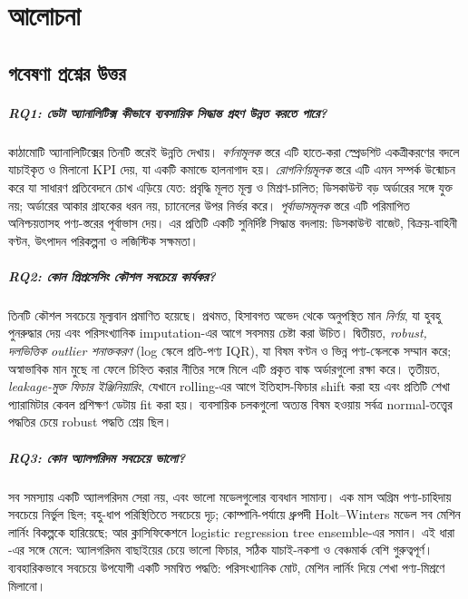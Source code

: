 \chapter{আলোচনা}\label{ch:discussion}

\section{গবেষণা প্রশ্নের উত্তর}

\paragraph{RQ1: ডেটা অ্যানালিটিক্স কীভাবে ব্যবসায়িক সিদ্ধান্ত গ্রহণ উন্নত করতে পারে?}
কাঠামোটি অ্যানালিটিক্সের তিনটি স্তরেই উন্নতি দেখায়। \emph{বর্ণনামূলক} স্তরে এটি হাতে-করা স্প্রেডশিট একত্রীকরণের বদলে যাচাইকৃত ও
মিলানো KPI দেয়, যা একটি কমান্ডে হালনাগাদ হয়। \emph{রোগনির্ণয়মূলক} স্তরে এটি এমন সম্পর্ক উন্মোচন করে যা সাধারণ প্রতিবেদনে চোখ
এড়িয়ে যেত: প্রবৃদ্ধি মূলত মূল্য ও মিশ্রণ-চালিত; ডিসকাউন্ট বড় অর্ডারের সঙ্গে যুক্ত নয়; অর্ডারের আকার গ্রাহকের ধরন নয়, চ্যানেলের উপর নির্ভর
করে। \emph{পূর্বাভাসমূলক} স্তরে এটি পরিমাপিত অনিশ্চয়তাসহ পণ্য-স্তরের পূর্বাভাস দেয়। এর প্রতিটি একটি সুনির্দিষ্ট সিদ্ধান্ত বদলায়: ডিসকাউন্ট
বাজেট, বিক্রয়-বাহিনী বণ্টন, উৎপাদন পরিকল্পনা ও লজিস্টিক সক্ষমতা।

\paragraph{RQ2: কোন প্রিপ্রসেসিং কৌশল সবচেয়ে কার্যকর?}
তিনটি কৌশল সবচেয়ে মূল্যবান প্রমাণিত হয়েছে। প্রথমত, হিসাবগত অভেদ থেকে অনুপস্থিত মান \emph{নির্ণয়}, যা হুবহু পুনরুদ্ধার দেয় এবং
পরিসংখ্যানিক imputation-এর আগে সবসময় চেষ্টা করা উচিত। দ্বিতীয়ত, \emph{robust, দলভিত্তিক outlier শনাক্তকরণ} (log স্কেলে প্রতি-পণ্য
IQR), যা বিষম বণ্টন ও ভিন্ন পণ্য-স্কেলকে সম্মান করে; অস্বাভাবিক মান মুছে না ফেলে চিহ্নিত করার নীতির সঙ্গে মিলে এটি প্রকৃত বাল্ক অর্ডারগুলো
রক্ষা করে। তৃতীয়ত, \emph{leakage-মুক্ত ফিচার ইঞ্জিনিয়ারিং}, যেখানে rolling-এর আগে ইতিহাস-ফিচার shift করা হয় এবং প্রতিটি শেখা প্যারামিটার
কেবল প্রশিক্ষণ ডেটায় fit করা হয়। ব্যবসায়িক চলকগুলো অত্যন্ত বিষম হওয়ায় সর্বত্র normal-তত্ত্বের পদ্ধতির চেয়ে robust পদ্ধতি শ্রেয় ছিল।

\paragraph{RQ3: কোন অ্যালগরিদম সবচেয়ে ভালো?}
সব সমস্যায় একটি অ্যালগরিদম সেরা নয়, এবং ভালো মডেলগুলোর ব্যবধান সামান্য। এক মাস অগ্রিম পণ্য-চাহিদায় \BestReg সবচেয়ে নির্ভুল ছিল;
বহু-ধাপ পরিস্থিতিতে \BestRec সবচেয়ে দৃঢ়; কোম্পানি-পর্যায়ে ধ্রুপদী Holt--Winters মডেল সব মেশিন লার্নিং বিকল্পকে হারিয়েছে; আর
ক্লাসিফিকেশনে logistic regression tree ensemble-এর সমান। এই ধারা \citet{makridakis2018}-এর সঙ্গে মেলে: অ্যালগরিদম বাছাইয়ের চেয়ে
ভালো ফিচার, সঠিক যাচাই-নকশা ও বেঞ্চমার্ক বেশি গুরুত্বপূর্ণ। ব্যবহারিকভাবে সবচেয়ে উপযোগী একটি সমন্বিত পদ্ধতি: পরিসংখ্যানিক মোট, মেশিন
লার্নিং দিয়ে শেখা পণ্য-মিশ্রণে মিলানো।

